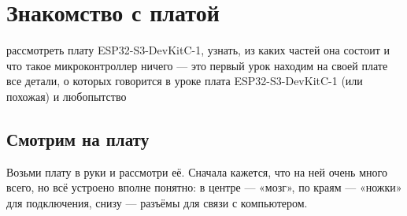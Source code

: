 \section{Знакомство с платой}
\label{les:board}
\lessonintro
  {рассмотреть плату ESP32-S3-DevKitC-1, узнать, из каких частей она состоит и что такое микроконтроллер}
  {ничего --- это первый урок}
  {находим на своей плате все детали, о которых говорится в уроке}
  {плата ESP32-S3-DevKitC-1 (или похожая) и любопытство}

\subsection{Смотрим на плату}

Возьми плату в руки и рассмотри её. Сначала кажется, что на ней очень много всего, но всё
устроено вполне понятно: в центре --- «мозг», по краям --- «ножки» для подключения, снизу ---
разъёмы для связи с компьютером.

